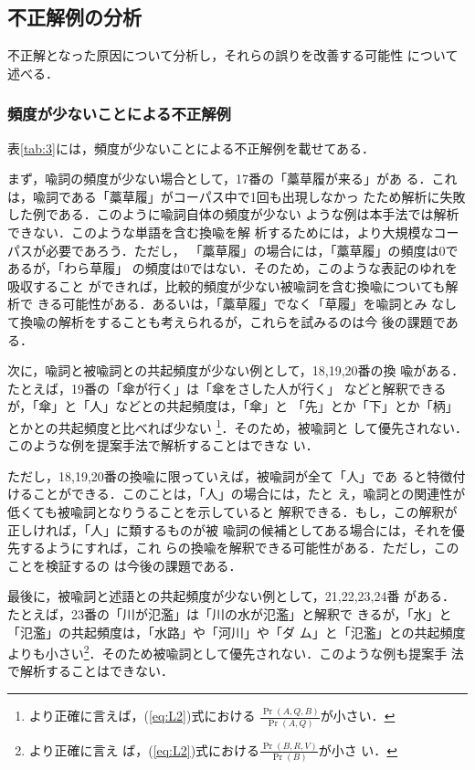 \subsection{不正解例の分析}
\label{sec:analysis}

不正解となった原因について分析し，それらの誤りを改善する可能性
について述べる．

\subsubsection{頻度が少ないことによる不正解例}

表\ref{tab:3}には，頻度が少ないことによる不正解例を載せてある．

まず，喩詞の頻度が少ない場合として，17番の「藁草履が来る」があ
る．これは，喩詞である「藁草履」がコーパス中で1回も出現しなかっ
たため解析に失敗した例である．このように喩詞自体の頻度が少ない
ような例は本手法では解析できない．このような単語を含む換喩を解
析するためには，より大規模なコーパスが必要であろう．ただし，
「藁草履」の場合には，「藁草履」の頻度は0であるが，「わら草履」
の頻度は0ではない．そのため，このような表記のゆれを吸収すること
ができれば，比較的頻度が少ない被喩詞を含む換喩についても解析で
きる可能性がある．あるいは，「藁草履」でなく「草履」を喩詞とみ
なして換喩の解析をすることも考えられるが，これらを試みるのは今
後の課題である．

次に，喩詞と被喩詞との共起頻度が少ない例として，18,19,20番の換
喩がある．たとえば，19番の「傘が行く」は「傘をさした人が行く」
などと解釈できるが，「傘」と「人」などとの共起頻度は，「傘」と
「先」とか「下」とか「柄」とかとの共起頻度と比べれば少ない
\footnote{より正確に言えば，(\ref{eq:L2})式における
  $\frac{\Pr(A,Q,B)}{\Pr(A,Q)}$が小さい．}．そのため，被喩詞と
して優先されない．このような例を提案手法で解析することはできな
い．

ただし，18,19,20番の換喩に限っていえば，被喩詞が全て「人」であ
ると特徴付けることができる．このことは，「人」の場合には，たと
え，喩詞との関連性が低くても被喩詞となりうることを示していると
解釈できる．もし，この解釈が正しければ，「人」に類するものが被
喩詞の候補としてある場合には，それを優先するようにすれば，これ
らの換喩を解釈できる可能性がある．ただし，このことを検証するの
は今後の課題である．

最後に，被喩詞と述語との共起頻度が少ない例として，21,22,23,24番
がある．たとえば，23番の「川が氾濫」は「川の水が氾濫」と解釈で
きるが，「水」と「氾濫」の共起頻度は，「水路」や「河川」や「ダ
ム」と「氾濫」との共起頻度よりも小さい\footnote{より正確に言え
  ば，(\ref{eq:L2})式における$\frac{\Pr(B,R,V)}{\Pr(B)}$が小さ
  い．}．そのため被喩詞として優先されない．このような例も提案手
法で解析することはできない．


